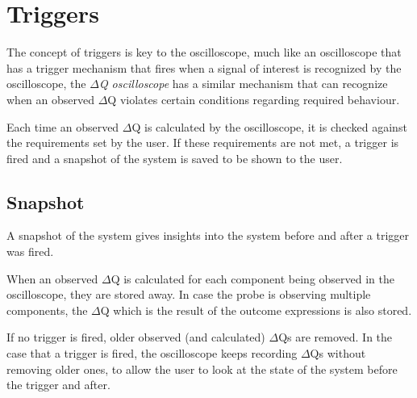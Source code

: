 \section{Triggers}
    The concept of triggers is key to the oscilloscope, much like an oscilloscope that has a trigger mechanism that fires when a signal of interest is recognized by the oscilloscope, the \textit{$\Delta$Q oscilloscope} has a similar mechanism that can recognize when an observed $\Delta$Q violates certain conditions regarding required behaviour.

    Each time an observed $\Delta$Q is calculated by the oscilloscope, it is checked against the requirements set by the user. If these requirements are not met, a trigger is fired and a snapshot of the system is saved to be shown to the user. 
    
    \subsection{Snapshot}
    A snapshot of the system gives insights into the system before and after a trigger was fired.

When an observed $\Delta$Q is calculated for each component being observed in the oscilloscope, they are stored away. In case the probe is observing multiple components, the $\Delta$Q which is the result of the outcome expressions is also stored.

If no trigger is fired, older observed (and calculated) $\Delta$Qs are removed. In the case that a trigger is fired, the oscilloscope keeps recording $\Delta$Qs without removing older ones, to allow the user to look at the state of the system before the trigger and after.
    

